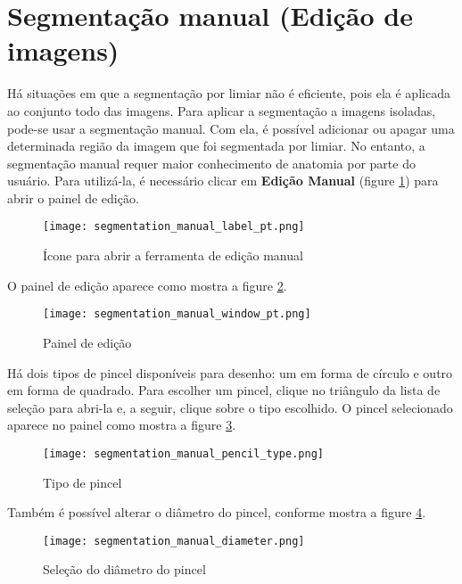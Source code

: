 \section{Segmentação manual (Edição de imagens)}

Há situações em que a segmentação por limiar não é eficiente, pois ela é aplicada ao conjunto
todo das imagens. Para aplicar a segmentação a imagens isoladas, pode-se usar a segmentação
manual. Com ela, é possível adicionar ou apagar uma determinada região da imagem que foi
segmentada por limiar. No entanto, a segmentação manual requer maior conhecimento de anatomia
por parte do usuário. Para utilizá-la, é necessário clicar em \textbf{Edição Manual} (figure \ref{fig:advanced_edition}) para abrir o painel de edição.

\begin{figure}[!htb]
\centering
\texttt{[image: segmentation\_manual\_label\_pt.png]}
\caption{Ícone para abrir a ferramenta de edição manual}
\label{fig:advanced_edition}
\end{figure}

O painel de edição aparece como mostra a figure \ref{fig:edition_slices_ref}.

\begin{figure}[!htb]
\centering
\texttt{[image: segmentation\_manual\_window\_pt.png]}
\caption{Painel de edição}
\label{fig:edition_slices_ref}
\end{figure}

Há dois tipos de pincel disponíveis para desenho: um em forma de círculo e outro em forma
de quadrado. Para escolher um pincel, clique no triângulo da lista de seleção para abri-la
e, a seguir, clique sobre o tipo escolhido. O pincel selecionado aparece no painel como
mostra a figure \ref{fig:brush_type}.

\begin{figure}[!htb]
\centering
\texttt{[image: segmentation\_manual\_pencil\_type.png]}
\caption{Tipo de pincel}
\label{fig:brush_type}
\end{figure}

\newpage

Também é possível alterar o diâmetro do pincel, conforme mostra a figure \ref{fig:select_diameter}.

\begin{figure}[!htb]
\centering
\texttt{[image: segmentation\_manual\_diameter.png]}
\caption{Seleção do diâmetro do pincel}
\label{fig:select_diameter}
\end{figure}

